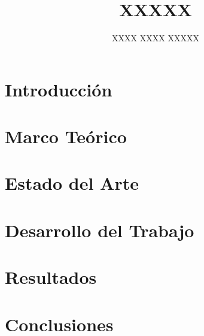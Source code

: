 \documentclass[final,letterpaper,oneside,authoryear,11pt,singlespace,spanish]{ezthesis}
\author{XXXX XXXX XXXXX}
\title{XXXXX}
\begin{document}
\cleardoublepage
{}
\setcounter{page}{1}





%




\tableofcontents
\renewcommand{\listfigurename}{Índice de Figuras}
\listoffigures
\renewcommand{\listtablename}{Índice de Tablas}
\listoftables

\cleardoublepage
{}
\setcounter{page}{1}


\chapter{Introducción}  \label{cap:introduccion}


\chapter{Marco Teórico} \label{cap:marco_teorico}


\chapter{Estado del Arte} 
\label{cap:estado_del_arte}

\chapter{Desarrollo del Trabajo} \label{cap:metodologia}


\chapter{Resultados}  \label{cap:aplicacion}


\chapter{Conclusiones} \label{cap:conclusion}



% 


\end{document}
